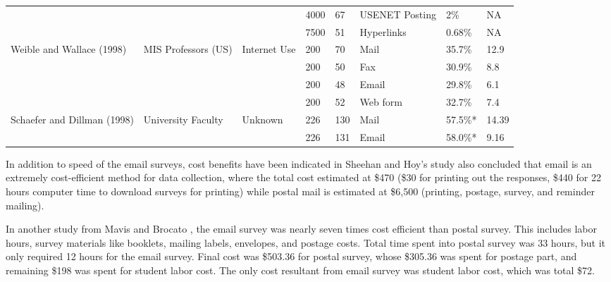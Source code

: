 \begin{center}
\begin{longtable}{ | p{2cm} | p{2cm} | p{2cm} | p{0.75cm} | p{0.75cm} | p{1cm} | p{1cm} | p{0.5cm} | }
	&  &  & 4000 & 67 & USENET Posting & 2\% & NA \\ \cline{4-8}
	&  &  & 7500 & 51 & Hyperlinks & 0.68\% & NA \\ \hline 
    \multirow{4}{2cm}{Weible and Wallace (1998)} & \multirow{4}{2cm}{MIS Professors (US)} & \multirow{4}{2cm}{Internet Use} & 200 & 70 & Mail & 35.7\% & 12.9 \\ \cline{4-8}
	&  &  & 200 & 50 & Fax & 30.9\% & 8.8 \\ \cline{4-8}
	&  &  & 200 & 48 & Email & 29.8\% & 6.1 \\ \cline{4-8}
	&  &  & 200 & 52 & Web form & 32.7\% & 7.4 \\ \hline
    \multirow{2}{2cm}{Schaefer and Dillman (1998)} & \multirow{2}{2cm}{University Faculty} & \multirow{2}{2cm}{Unknown} & 226 & 130 & Mail & 57.5\%* & 14.39 \\ \cline{4-8}
	&  &  & 226 & 131 & Email & 58.0\%* & 9.16 \\ \hline
    \end{longtable}
\end{center}


In addition to speed of the email surveys, cost benefits have been indicated in Sheehan and Hoy's study \citep{Sheehan2006} also concluded that email is an extremely cost-efficient method for data collection, where the total cost estimated at \$470 (\$30 for printing out the responses, \$440 for 22 hours computer time to download surveys for printing) while postal mail is estimated at \$6,500 (printing, postage, survey, and reminder mailing).
\vspace{1cm}

In another study from Mavis and Brocato \citep{Mavis1998}, the email survey was nearly seven times cost efficient than postal survey. This includes labor hours, survey materials like booklets, mailing labels, envelopes, and postage costs. Total time spent into postal survey was 33 hours, but it only required 12 hours for the email survey. Final cost was \$503.36 for postal survey, whose \$305.36 was spent for postage part, and remaining \$198 was spent for student labor cost. The only cost resultant from email survey was student labor cost, which was total \$72.
\vspace{1cm}

